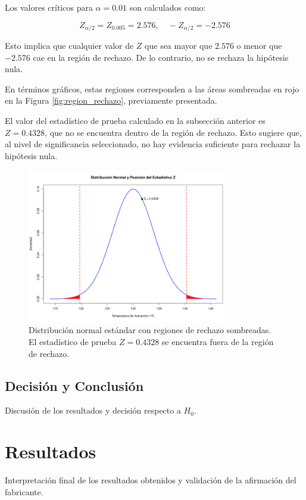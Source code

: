 \documentclass[a4paper,12pt]{article}
\begin{document}
Los valores críticos para \( \alpha = 0.01 \) son calculados como:

\[
Z_{\alpha/2} = Z_{0.005} = 2.576, \quad -Z_{\alpha/2} = -2.576
\]

Esto implica que cualquier valor de \( Z \) que sea mayor que \( 2.576 \) o menor que \( -2.576 \) cae en la región de rechazo. De lo contrario, no se rechaza la hipótesis nula.

En términos gráficos, estas regiones corresponden a las áreas sombreadas en rojo en la Figura \ref{fig:region_rechazo}, previamente presentada.

El valor del estadístico de prueba calculado en la subsección anterior es \( Z = 0.4328 \), que no se encuentra dentro de la región de rechazo. Esto sugiere que, al nivel de significancia seleccionado, no hay evidencia suficiente para rechazar la hipótesis nula.
\begin{figure}[h!]
\centering
\includegraphics[width=0.8\textwidth]{posicion_Z.png}
\caption{Distribución normal estándar con regiones de rechazo sombreadas. El estadístico de prueba \( Z = 0.4328 \) se encuentra fuera de la región de rechazo.}
\label{fig:posicion_Z}
\end{figure}


\subsection{Decisión y Conclusión}
Discusión de los resultados y decisión respecto a \( H_0 \).

\section{Resultados}
Interpretación final de los resultados obtenidos y validación de la afirmación del fabricante.
\end{document}
